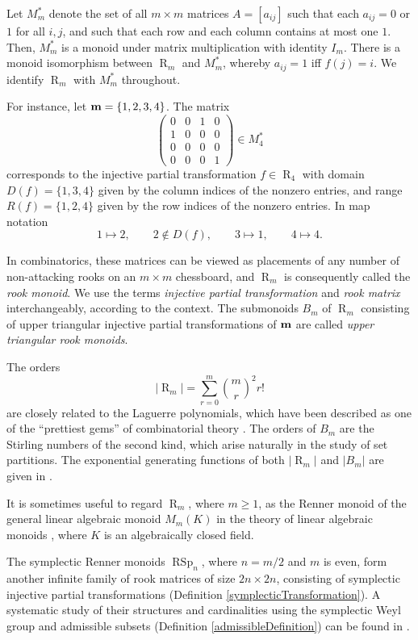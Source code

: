 \documentclass[11pt]{article}
\newcommand{\qq}{\qquad}
\newcommand{\ges}{\geqslant}
\DeclareMathOperator{\RSp}{RSp}
\DeclareMathOperator{\R}{R}
\begin{document}
Let $M^*_m$ denote the set of all $m\times m$ matrices $A=[a_{ij}]$ such that each $a_{ij}=0$ or $1$  for all $i,j$, and such that each row and each column contains at most one $1$. 
%
Then, $M_m^*$ is a monoid under matrix multiplication with identity $I_m$. There is a monoid isomorphism  between $\R_m$ and $ M_m^*$, whereby $a_{ij}=1$ if{f} $f(j)=i$. We identify $\R_m$ with $M^*_m$ throughout. 

For instance, let 
${\bf m}=\{1, 2, 3, 4\}$. The matrix
$$
                        \begin{pmatrix}
                        0&0&1&0\\
                        1&0&0&0\\
                        0&0&0&0\\
                        0&0&0&1
                        \end{pmatrix}\in M^*_4
$$
corresponds to the injective partial transformation $f\in \R_4$ with domain $D(f)=\{1, 3, 4\}$ given by the column indices of the nonzero entries, and range $R(f)=\{1, 2, 4\}$ given by the row indices of the nonzero entries. In map notation
\[
    1\mapsto 2,\qq 2\notin D(f),\qq 3\mapsto 1,\qq4\mapsto 4.
\]

In combinatorics, these matrices can be viewed as placements of any number of non-attacking rooks on an $m\times m$ chessboard, and $\R_m$ is consequently called the {\em rook monoid}. We use the terms {\em injective partial transformation} and {\em rook matrix} interchangeably, according to the context. The submonoids $B_m$ of $\R_m$ consisting of upper triangular injective partial transformations of ${\bf m}$ are called {\em upper triangular rook monoids}.

The orders $$|\R_m| = \sum_{r=0}^m {\binom mr}^2 r!$$
are closely related to the Laguerre polynomials, which have been described as one of the ``prettiest gems'' of combinatorial theory \cite{A, BRR}. The orders of $B_m$ are the Stirling numbers of the second kind, which arise naturally in the study of set partitions. The exponential generating functions of both $|\R_m|$ and $|B_m|$ are given in \cite{BRR}.

It is sometimes useful to regard $\R_m$, where $m\ges1$, as the Renner monoid of the general linear algebraic monoid $M_m(K)$ in the theory of linear algebraic monoids \cite{ZL, PU1, R1, SL1}, where $K$ is an algebraically closed field.

The symplectic Renner monoids $\RSp_n$, where $n=m/2$ and $m$ is even, form another infinite family of rook matrices of size $2n\times2n$, consisting of symplectic injective partial transformations (Definition \ref{symplecticTransformation}). A systematic study of their structures and cardinalities using the symplectic Weyl group and admissible subsets (Definition \ref{admissibleDefinition}) can be found in \cite{CLSW, ZHL}.
\end{document}
